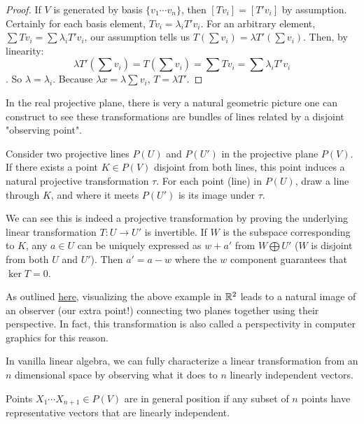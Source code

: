 \documentclass[10pt]{article}
\begin{document}
\begin{proof}
	If $V$ is generated by basis $\{ v_1 \cdots v_n \}$, then $[Tv_i] = [T'v_i]$
	by assumption. Certainly for each basis element, $Tv_i = \lambda_i T'v_i$.
	For an arbitrary element, $\sum Tv_i = \sum \lambda_i T'v_i$, our assumption tells us $T(\sum v_i) = \lambda
	T'(\sum v_i)$.
	Then, by linearity: \[ \lambda T'(\sum v_i) = T(\sum v_i) = \sum Tv_i = \sum \lambda_i T'v_i\].
	So $\lambda = \lambda_i$. Because $\lambda x = \lambda \sum v_i$, $T = \lambda T'$.
\end{proof}

In the real projective plane, there is very a natural geometric picture one can
construct to see these transformations are bundles of lines related by a
disjoint "observing point".

\begin{example}
Consider two projective lines $P(U)$ and $P(U')$ in the projective plane
$P(V)$. If there exists a point $K \in P(V)$ disjoint from both lines, this
point induces a natural projective transformation $\tau$. For each point (line) in
$P(U)$, draw a line through $K$, and where it meets $P(U')$ is its image under
$\tau$.

We can see this is indeed a projective transformation by proving the underlying
linear transformation $T: U \to U'$ is invertible. If $W$ is the subspace
corresponding to $K$, any $a \in U$ can be uniquely expressed as $w +
a'$ from $W \bigoplus U'$ ($W$ is disjoint from both $U$ and $U'$). Then $a' =
a - w$ where the $w$ component guarantees that $\ker T = 0$.

\end{example}

\begin{note}
	As outlined \href{https://en.wikipedia.org/wiki/Homography#Geometric_motivation}{here},
visualizing the above example in $\mathbb{R}^2$ leads to a natural image of an observer
(our extra point!) connecting two planes together using their perspective. In
fact, this transformation is also called a perspectivity in computer graphics for this
reason.
\end{note}

In vanilla linear algebra, we can fully characterize a linear transformation from an
$n$ dimensional space by observing what it does to $n$ linearly independent
vectors. 

\begin{definition}
	 Points $X_1 \cdots X_{n+1} \in P(V)$ are in general position if any subset
	 of $n$ points have representative vectors that are linearly independent.
\end{definition}
\end{document}
